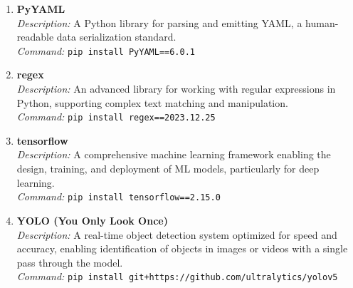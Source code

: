 \begin{enumerate}
	\item \textbf{PyYAML} \\
	\emph{Description:} A Python library for parsing and emitting YAML, a human-readable data serialization standard. \\
	\emph{Command:} \texttt{pip install PyYAML==6.0.1}
	
	\item \textbf{regex} \\
	\emph{Description:} An advanced library for working with regular expressions in Python, supporting complex text matching and manipulation. \\
	\emph{Command:} \texttt{pip install regex==2023.12.25}
	
	\item \textbf{tensorflow} \\
	\emph{Description:} A comprehensive machine learning framework enabling the design, training, and deployment of ML models, particularly for deep learning. \\
	\emph{Command:} \texttt{pip install tensorflow==2.15.0}
	
	\item \textbf{YOLO (You Only Look Once)} \\
	\emph{Description:} A real-time object detection system optimized for speed and accuracy, enabling identification of objects in images or videos with a single pass through the model. \\
	\emph{Command:} \texttt{pip install git+https://github.com/ultralytics/yolov5}
\end{enumerate}



